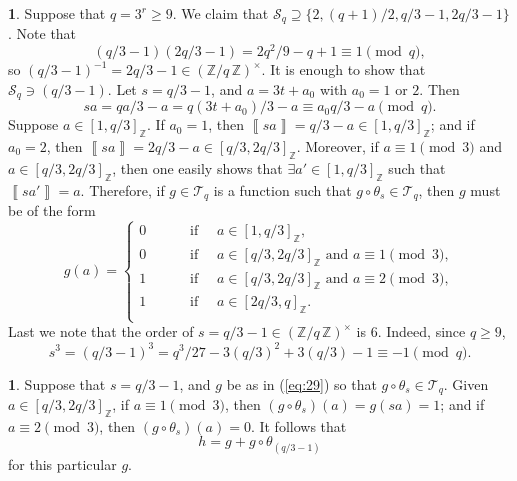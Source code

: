 \documentclass{amsart}[11pt]
\theoremstyle{definition}
\newtheorem{sect}[thm]{}
\numberwithin{equation}{section}
\theoremstyle{notitle}
\begin{document}
\begin{sect}\label{subsec:special-form-of-g-when-s-has-order-6}
Suppose that $q=3^r\geq 9$. We claim that ${\mathscr{S}}_q\supseteq
\{2, (q+1)/2, q/3-1, 2q/3-1\}$. Note that 
\[ (q/3-1)(2q/3-1)= 2q^2/9 - q +1 \equiv 1 \pmod{q}, \] so
$(q/3-1)^{-1}= 2q/3-1\in {(\mathbb{Z}/ {q}\, \mathbb{Z})^\times}$. It is enough to show that
${\mathscr{S}}_q\ni (q/3-1)$. Let $s=q/3-1$, and $a=3t+a_0$ with $a_0=1$ or
$2$. Then
\[ sa= qa/3- a =q(3t+a_0)/3 -a \equiv a_0q/3 -a \pmod{q}.\] Suppose
$a\in [1, q/3]_{\mathbb{Z}}$. If $a_0=1$, then ${\left\llbracket {sa} \right\rrbracket}= q/3-a\in [1,
q/3]_{\mathbb{Z}}$; and if $a_0=2$, then ${\left\llbracket {sa} \right\rrbracket} = 2q/3-a\in [q/3,
2q/3]_{\mathbb{Z}}$. Moreover, if $a\equiv 1\pmod{3}$ and $a\in [q/3,
2q/3]_{\mathbb{Z}}$, then one easily shows that $\exists a'\in [1, q/3]_{\mathbb{Z}}$
such that ${\left\llbracket {sa'} \right\rrbracket}=a$. Therefore, if $g\in {\mathscr{T}}_q$ is a function
such that $g\circ \theta_s\in {\mathscr{T}}_q$, then $g$ must be of the form
\begin{equation}
  \label{eq:29}
 g(a)=\left\{
  \begin{aligned}
   0    &\qquad     \text{ if } \quad a \in [1, q/3]_{\mathbb{Z}},\\
   0    &\qquad     \text{ if } \quad a\in [q/3, 2q/3]_{\mathbb{Z}} \text { and
     } a \equiv 1 \pmod{3},\\
   1   &\qquad     \text{ if } \quad a \in [q/3, 2q/3]_{\mathbb{Z}} \text { and
     } a  \equiv 2 \pmod{3},\\
   1    &\qquad     \text{ if }\quad  a \in [2q/3, q]_{\mathbb{Z}}.\\
  \end{aligned}\right.
\end{equation}
Last we note that the order of $s= q/3-1\in {(\mathbb{Z}/ {q}\, \mathbb{Z})^\times}$ is $6$. Indeed,
since $q\geq 9$, 
\[ s^3= (q/3-1)^3= q^3/27 - 3 (q/3)^2 + 3 (q/3) -1 \equiv -1 \pmod{q}.\]
\end{sect}

\begin{sect}
  Suppose that $s=q/3-1$, and $g$ be as in (\ref{eq:29}) so that
  $g\circ \theta_s\in {\mathscr{T}}_q$. Given $a\in [q/3, 2q/3]_{\mathbb{Z}}$, if
  $a\equiv 1 \pmod{3}$, then $(g\circ\theta_s)(a)=g(sa)=1$; and if
  $a\equiv 2\pmod{3}$, then $(g\circ \theta_s)(a)=0$.  It follows that
\[ h = g+ g\circ \theta_{(q/3-1)}\]
for this particular $g$. 
\end{sect} 
\end{document}
